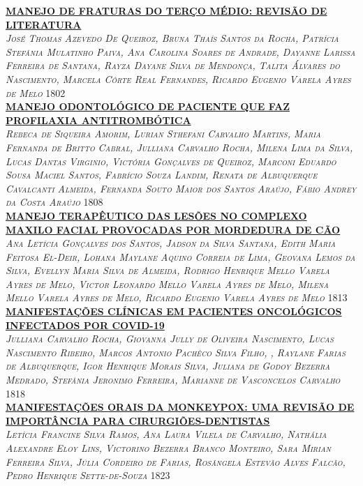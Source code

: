 \noindent \textsc{\hyperlink{trabalhos/249977.pdf.1}{\textbf{MANEJO DE FRATURAS DO TERÇO MÉDIO: REVISÃO DE LITERATURA}}}\\ 
\noindent \textsc{\textit{José Thomas Azevedo De Queiroz, Bruna Thaís Santos da Rocha, Patrícia Stefânia Mulatinho Paiva, Ana Carolina Soares de Andrade, Dayanne Larissa Ferreira de Santana, Rayza Dayane Silva de Mendonça, Talita Álvares do Nascimento, Marcela Côrte Real Fernandes, Ricardo Eugenio Varela Ayres de Melo}} \hfill 1802\\ 

\noindent \textsc{\hyperlink{trabalhos/249617.pdf.1}{\textbf{MANEJO ODONTOLÓGICO DE PACIENTE QUE FAZ PROFILAXIA ANTITROMBÓTICA}}}\\ 
\noindent \textsc{\textit{Rebeca de Siqueira Amorim, Lurian Sthefani Carvalho Martins, Maria Fernanda de Britto Cabral, Julliana Carvalho Rocha, Milena Lima da Silva, Lucas Dantas Virginio, Victória Gonçalves de Queiroz, Marconi Eduardo Sousa Maciel Santos, Fabrício Souza Landim, Renata de Albuquerque Cavalcanti Almeida, Fernanda Souto Maior dos Santos Araújo, Fábio Andrey da Costa Araújo}} \hfill 1808\\ 

\noindent \textsc{\hyperlink{trabalhos/251705.pdf.1}{\textbf{MANEJO TERAPÊUTICO DAS LESÕES NO COMPLEXO MAXILO FACIAL PROVOCADAS POR MORDEDURA DE CÃO}}}\\ 
\noindent \textsc{\textit{Ana Letícia Gonçalves dos Santos, Jadson da  Silva Santana, Edith Maria Feitosa El-Deir, Lohana Maylane Aquino Correia de Lima, Geovana Lemos da Silva, Evellyn Maria Silva de Almeida, Rodrigo Henrique Mello Varela Ayres de Melo, Victor Leonardo Mello Varela Ayres de Melo, Milena Mello Varela Ayres de Melo, Ricardo Eugenio Varela Ayres de Melo}} \hfill 1813\\ 

\noindent \textsc{\hyperlink{trabalhos/250300.pdf.1}{\textbf{MANIFESTAÇÕES CLÍNICAS EM PACIENTES ONCOLÓGICOS INFECTADOS POR COVID-19}}}\\ 
\noindent \textsc{\textit{Julliana Carvalho Rocha, Giovanna Jully de Oliveira Nascimento, Lucas Nascimento Ribeiro, Marcos Antonio Pachêco Silva Filho, , Raylane Farias de Albuquerque, Igor Henrique Morais Silva, Juliana de Godoy Bezerra Medrado, Stefânia Jeronimo Ferreira, Marianne de Vasconcelos Carvalho}} \hfill 1818\\ 

\noindent \textsc{\hyperlink{trabalhos/251216.pdf.1}{\textbf{MANIFESTAÇÕES ORAIS DA MONKEYPOX: UMA REVISÃO DE IMPORTÂNCIA PARA CIRURGIÕES-DENTISTAS}}}\\ 
\noindent \textsc{\textit{Letícia Francine Silva Ramos, Ana Laura Vilela de Carvalho, Nathália Alexandre Eloy Lins, Victorino Bezerra Branco Monteiro, Sara Mirian Ferreira Silva, Júlia Cordeiro de Farias, Rosângela Estevão Alves Falcão, Pedro Henrique Sette-de-Souza}} \hfill 1823\\ 

